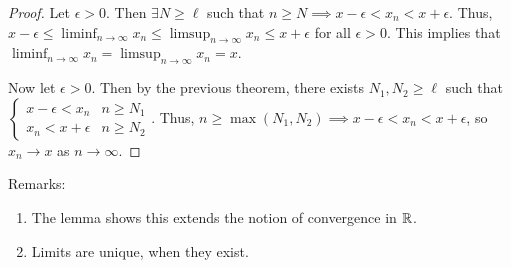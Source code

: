 \documentclass{report}
\begin{document}
\begin{proof}
    Let $\epsilon > 0$. Then $\exists N \geq \ell$ such that $n \geq N \implies x - \epsilon < x_n < x + \epsilon$. Thus, $x - \epsilon \leq \liminf_{n \to \infty} x_n \leq \limsup_{n \to \infty} x_n \leq x + \epsilon$ for all $\epsilon > 0$. This implies that $\liminf_{n \to \infty} x_n = \limsup_{n \to \infty} x_n = x$.

    Now let $\epsilon > 0$. Then by the previous theorem, there exists $N_1 , N_2 \geq \ell$ such that $\begin{cases}
        x - \epsilon < x_n & n \geq N_1 \\
        x_n < x + \epsilon & n \geq N_2
    \end{cases}$. Thus, $n \geq \max(N_1, N_2) \implies x - \epsilon < x_n < x + \epsilon$, so $x_n \to x$ as $n \to \infty$.
\end{proof}

\noindent Remarks:
\begin{enumerate}
    \item The lemma shows this extends the notion of convergence in $\RR$.
    \item Limits are unique, when they exist.
\end{enumerate}

\end{document}
